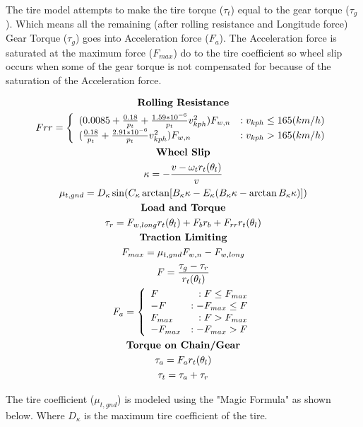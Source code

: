 \documentclass[../SimBALink.tex]{subfiles}
\begin{document}
The tire model attempts to make the tire torque ($\tau_t$) equal to the gear torque ($\tau_g$). Which means all the remaining (after rolling resistance and Longitude force) Gear Torque ($\tau_g$) goes into Acceleration force ($F_a$). The Acceleration force is saturated at the maximum force ($F_{max}$) do to the tire coefficient so wheel slip occurs when some of the gear torque is not compensated for because of the saturation of the Acceleration force.

\begin{gather}
\notag \textbf{Rolling Resistance} \\
Frr = 
\left\{
  \begin{array}{lr}
    (0.0085 + \frac{0.18}{p_t} + \frac{1.59*10^{-6}}{p_t}v_{kph}^2)F_{w,n} & : v_{kph} \le 165 (km/h)\\
    (\frac{0.18}{p_t} + \frac{2.91*10^{-6}}{p_t}v_{kph}^2)F_{w,n} & : v_{kph} > 165 (km/h)
  \end{array}
\right. \\
\notag \textbf{Wheel Slip} \\
\kappa = -\frac{v - \omega_t r_t(\theta_l)}{v} \\
\mu_{t,gnd} =  D_{\kappa}\sin(C_{\kappa} \arctan[B_{\kappa}\kappa - E_{\kappa}(B_{\kappa}\kappa - \arctan B_{\kappa}\kappa)])  \\
\notag \textbf{Load and Torque} \\
\tau_r = F_{w,long}r_t(\theta_l) + F_br_b + F_{rr}r_t(\theta_l) \\
\notag \textbf{Traction Limiting} \\
F_{max} = \mu_{t,gnd} F_{w,n} - F_{w,long} \\
F = \frac{\tau_g - \tau_r}{r_t(\theta_l)} \\
F_a =
\left\{
  \begin{array}{lr}
	F 	& : F \le F_{max} \\
	-F 	& : -F_{max} \le F \\
	F_{max} & : F > F_{max} \\
	-F_{max} & : -F_{max} > F
  \end{array}
\right. \\
\notag \textbf{Torque on Chain/Gear} \\
\tau_a = F_ar_t(\theta_l) \\
\tau_t = \tau_a + \tau_r
\end{gather}

The tire coefficient ($\mu_{t,gnd}$) is modeled using the "Magic Formula" as shown below. Where $D_{\kappa}$ is the maximum tire coefficient of the tire. 
\end{document}

